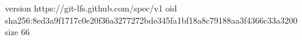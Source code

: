 version https://git-lfs.github.com/spec/v1
oid sha256:8ed3a9f1717c0e20f36a3277272bde345fa1bf18a8c79188aa3f4366c33a3200
size 66
